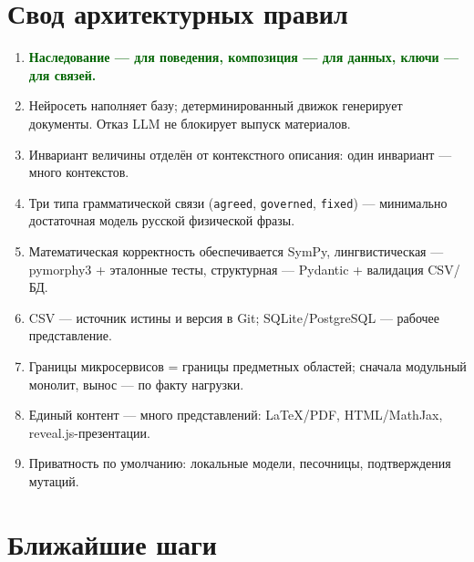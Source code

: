 \documentclass[12pt,a4paper]{article}
\newcommand{\idea}[1]{\textcolor{darkgreen}{\textbf{#1}}}
\begin{document}
\section{Свод архитектурных правил}

\begin{enumerate}
  \item \idea{Наследование --- для поведения, композиция --- для данных, ключи --- для связей.}
  \item Нейросеть наполняет базу; детерминированный движок генерирует документы. Отказ LLM не блокирует выпуск материалов.
  \item Инвариант величины отделён от контекстного описания: один инвариант --- много контекстов.
  \item Три типа грамматической связи (\texttt{agreed}, \texttt{governed}, \texttt{fixed}) --- минимально достаточная модель русской физической фразы.
  \item Математическая корректность обеспечивается SymPy, лингвистическая --- pymorphy3 + эталонные тесты, структурная --- Pydantic + валидация CSV/БД.
  \item CSV --- источник истины и версия в Git; SQLite/PostgreSQL --- рабочее представление.
  \item Границы микросервисов = границы предметных областей; сначала модульный монолит, вынос --- по факту нагрузки.
  \item Единый контент --- много представлений: LaTeX/PDF, HTML/MathJax, reveal.js-презентации.
  \item Приватность по умолчанию: локальные модели, песочницы, подтверждения мутаций.
\end{enumerate}

\section{Ближайшие шаги}
\end{document}
